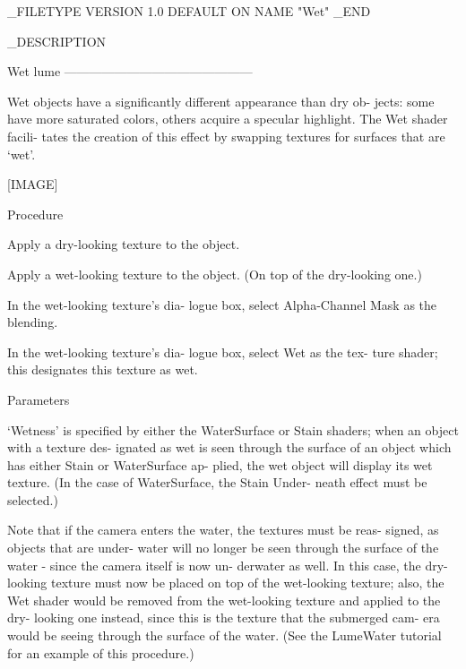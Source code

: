 _FILETYPE
VERSION	 1.0
DEFAULT	 ON
NAME	"Wet"
_END


_DESCRIPTION


Wet                                      lume
---------------------------------------------


       Wet objects have a significantly
       different appearance than dry ob-
       jects: some have more saturated
       colors, others acquire a specular
       highlight. The Wet shader facili-
       tates the creation of this effect
       by swapping textures for surfaces
       that are `wet'.

       [IMAGE]



  Procedure

        Apply a dry-looking texture to the
        object.

        Apply a wet-looking texture to the
        object. (On top of the dry-looking
        one.)

        In the wet-looking texture's dia-
        logue box, select Alpha-Channel
        Mask as the blending.

        In the wet-looking texture's dia-
        logue box, select Wet as the tex-
        ture shader; this designates this
        texture as wet.



  Parameters

       `Wetness' is specified by either
       the WaterSurface or Stain shaders;
       when an object with a texture des-
       ignated as wet is seen through
       the surface of an object which has
       either Stain or WaterSurface ap-
       plied, the wet object will display
       its wet texture. (In the case of
       WaterSurface, the Stain Under-
       neath effect must be selected.)

       Note that if the camera enters the
       water, the textures must be reas-
       signed, as objects that are under-
       water will no longer be seen
       through the surface of the water -
       since the camera itself is now un-
       derwater as well. In this case, the
       dry-looking texture must now be
       placed on top of the wet-looking
       texture; also, the Wet shader would
       be removed from the wet-looking
       texture and applied to the dry-
       looking one instead, since this is
       the texture that the submerged cam-
       era would be seeing through the
       surface of the water. (See the
       LumeWater tutorial for an example
       of this procedure.)

